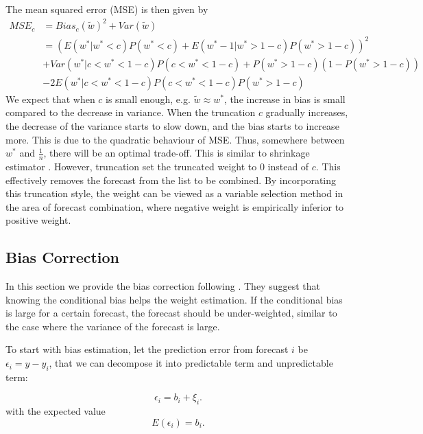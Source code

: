 \documentclass[11pt]{article}
\begin{document}
The mean squared error (MSE) is then given by 
\begin{equation}
\label{eqn: MSE trunc}
\begin{aligned}
MSE_c &= Bias_c(\tilde{w})^2 + Var(\tilde{w})\\
&=(E(w^*|w^*<c)P(w^*<c) + E(w^*-1|w^*>1-c)P(w^*>1-c))^2 \\
&+ Var(w^*|c<w^*<1-c)P(c<w^*<1-c) + P(w^*>1-c)(1-P(w^*>1-c)) \\
&- 2E(w^*|c<w^*<1-c)P(c<w^*<1-c)P(w^*>1-c)
\end{aligned}
\end{equation}
We expect that when $c$ is small enough, e.g. $\tilde{w}\approx w^*$, the increase in bias is small compared to the decrease in variance. When the truncation $c$ gradually increases, the decrease of the variance starts to slow down, and the bias starts to increase more. This is due to the quadratic behaviour of MSE. Thus, somewhere between $w^*$ and $\frac{1}{n}$, there will be an optimal trade-off. This is similar to shrinkage estimator \citep{James1961}. However, truncation set the truncated weight to 0 instead of $c$. This effectively removes the forecast from the list to be combined. By incorporating this truncation style, the weight can be viewed as a variable selection method in the area of forecast combination, where negative weight is empirically inferior to positive weight. 

\subsection{Bias Correction}\label{bias-correction}
In this section we provide the bias correction following \cite{Gibbs2017}. They suggest that knowing the conditional bias helps the weight estimation. If the conditional bias is large for a certain forecast, the forecast should be under-weighted, similar to the case where the variance of the forecast is large.

To start with bias estimation, let the prediction error from forecast \(i\) be \(\epsilon_i = y - y_i\), that we can decompose it into predictable term and unpredictable term:

\begin{equation}
\label{eqn: w bias assumption}
\epsilon_i = b_i + \xi_i. 
\end{equation}
with the expected value
\begin{equation}
\label{eqn: bias estimate}
E(\epsilon_i) = b_i.
\end{equation}
\end{document}
